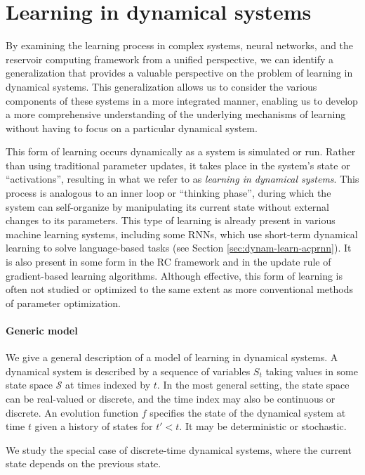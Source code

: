 \section{Learning in dynamical systems}

By examining the learning process in complex systems, neural networks, and
the reservoir computing framework from a unified perspective, we can
identify a generalization that provides a valuable perspective on the problem of
learning in dynamical systems. This generalization allows us to consider the
various components of these systems in a more integrated manner, enabling us to
develop a more comprehensive understanding of the underlying mechanisms of
learning without having to focus on a particular dynamical system.

This form of learning occurs dynamically as a system is simulated or run. Rather
than using traditional parameter updates, it takes place in the system's state
or ``activations'', resulting in what we refer to as \emph{learning in dynamical
  systems}. This process is analogous to an inner loop or ``thinking phase'',
during which the system can self-organize by manipulating its current state
without external changes to its parameters. This type of learning is already
present in various machine learning systems, including some \acfp{RNN}, which
use short-term dynamical learning to solve language-based tasks (see Section
\ref{sec:dynam-learn-acprnn}). It is also present in some form in the \ac{RC}
framework and in the update rule of gradient-based learning algorithms. Although
effective, this form of learning is often not studied or optimized to the same
extent as more conventional methods of parameter optimization.

\paragraph{Generic model}\label{sec:generic-model}
We give a general description of a model of learning in dynamical systems. A
dynamical system is described by a sequence of variables $S_{t}$ taking values
in some state space $\mathcal{S}$ at times indexed by $t$. In the most general setting, the
state space can be real-valued or discrete, and the time index may also be
continuous or discrete. An evolution function $f$ specifies the state of the
dynamical system at time $t$ given a history of states for $t' < t$. It may be
deterministic or stochastic.

We study the special case of discrete-time dynamical systems, where the current
state depends on the previous state.

